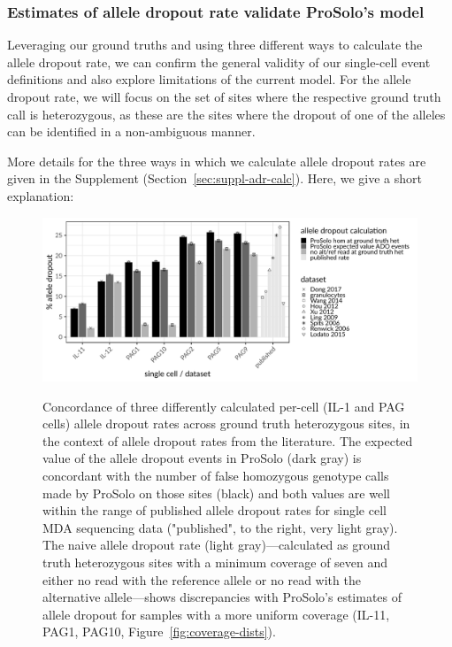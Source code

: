 \documentclass[12pt,inline]{wlscirep}
\begin{document}
\subsubsection{Estimates of allele dropout rate validate ProSolo's model}

Leveraging our ground truths and using three different ways to calculate the allele dropout rate, we can confirm the general validity of our single-cell event definitions and also explore limitations of the current model.
For the allele dropout rate, we will focus on the set of sites where the respective ground truth call is heterozygous, as these are the sites where the dropout of one of the alleles can be identified in a non-ambiguous manner.

More details for the three ways in which we calculate allele dropout rates are given in the Supplement (Section~\ref{sec:suppl-adr-calc}).
Here, we give a short explanation:

\begin{figure}[!tpb]
  \includegraphics[width=\linewidth]{figs/prosolo_ado-rate_expected-vs-ground-truth.pdf} \\
  \caption{
    Concordance of three differently calculated per-cell (IL-1 and PAG cells) allele dropout rates across ground truth heterozygous sites, in the context of allele dropout rates from the literature\cite{wang_clonal_2014,hou_single-cell_2012,xu_single-cell_2012,ling_evaluation_2009,spits_whole-genome_2006,spits_optimization_2006,renwick_proof_2006,lodato_somatic_2015}.
    The expected value of the allele dropout events in ProSolo (dark gray) is concordant with the number of false homozygous genotype calls made by ProSolo on those sites (black) and both values are well within the range of published allele dropout rates for single cell MDA sequencing data ("published", to the right, very light gray).
    The naive allele dropout rate (light gray)---calculated as ground truth heterozygous sites with a minimum coverage of seven and either no read with the reference allele or no read with the alternative allele---shows discrepancies with ProSolo's estimates of allele dropout for samples with a more uniform coverage (IL-11, PAG1, PAG10, Figure~\ref{fig:coverage-dists}).
  }
  \label{fig:allele-dropout}
\end{figure}
\end{document}

